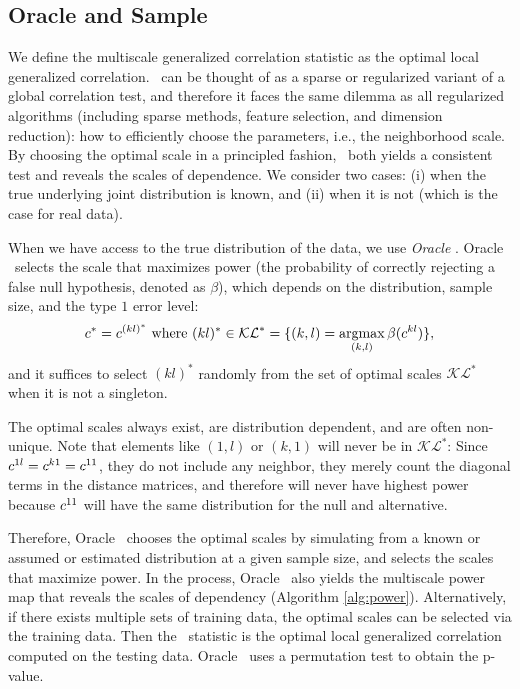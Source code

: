 \documentclass[11pt]{article}
\begin{document}
\subsection{Oracle and Sample \Mgc}
\label{appen:mgc2}

We define the multiscale generalized correlation statistic as the optimal local generalized correlation. 
\Mgc~can be thought of as a sparse or regularized variant of a global correlation test, and therefore it faces the same dilemma as all regularized algorithms (including sparse methods, feature selection, and dimension reduction): how to efficiently choose the parameters, i.e., the neighborhood scale. By choosing the optimal scale in a principled fashion, \Mgc~both yields a consistent test and reveals the scales of dependence.  We consider two cases: (i) when the true underlying joint distribution is known, and (ii) when it is not (which is the case for real data). 

When we have access to the true distribution of the data, we use \emph{Oracle} \Mgc.  Oracle \Mgc~selects the scale that maximizes power (the probability of correctly rejecting a false null hypothesis, denoted as $\beta$), which depends on the distribution, sample size, and the type $1$ error level:
\begin{align} \label{eq:popc}
\GG^{*} =  c^{(kl)^*}   \text{ where } (kl)^* \in \mathcal{KL}^* =\{(k,l)=\argmax_{(k,l)}\beta(\GG^{kl})\}, %
\end{align}
and it suffices to select $(kl)^*$ randomly from the set of optimal scales $\mathcal{KL}^*$ when it is not a singleton.

The optimal scales always exist,  are distribution dependent, and are often non-unique. Note that elements like $(1,l)$ or $(k,1)$ will never be in $\mathcal{KL}^*$: Since $c^{1l}=c^{k1}=c^{11}$, they do not include any neighbor,  they merely count the diagonal terms in the distance matrices, and therefore will never have highest power because $c^{11}$ will have the same distribution for the null and alternative. 


Therefore, Oracle \Mgc~chooses the optimal scales by simulating from a known or assumed or estimated distribution at a given sample size, and selects the scales that maximize power. In the process, Oracle \Mgc~also yields the multiscale power map that reveals the scales of dependency (Algorithm \ref{alg:power}). Alternatively, if there exists multiple sets of training data, the optimal scales can be selected via the training data. Then the \Mgc~statistic is the optimal local generalized correlation computed on the testing data. Oracle \Mgc~uses a permutation test to obtain the p-value.
\end{document}
